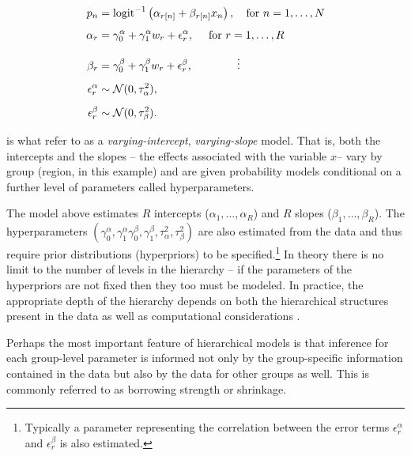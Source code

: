 %
\begin{align*}
p_n &= {\rm logit}^{-1}\left(\alpha_{r[n]} + \beta_{r[n]} x_n\right), \quad \text{for } n = 1, \dots, N \\[5pt]
 \alpha_r &= \gamma^\alpha_0 + \gamma^\alpha_1 w_r + \epsilon^\alpha_r, \quad \text{ for } r = 1, \dots, R \\[5pt]
  \beta_r &= \gamma^\beta_0 + \gamma^\beta_1 w_r + \epsilon^\beta_r, \qquad\qquad \vdots  \\[5pt]
   \epsilon^\alpha_r &\sim \mathcal{N}(0, \tau^2_\alpha), \\[5pt]
   \epsilon^\beta_r &\sim \mathcal{N}(0, \tau^2_\beta).
\end{align*}

\noindent is what  refer to as a {\it varying-intercept}, 
{\it varying-slope} model. That is, both the intercepts and the slopes -- the effects associated with the variable $x$-- vary by group (region, in this example) and are given probability models conditional on a further level of parameters called hyperparameters. 

The model above estimates $R$ intercepts ($\alpha_1, \dots, \alpha_R$) and $R$ slopes 
($\beta_1, \dots, \beta_R$). The hyperparameters
$(\gamma^\alpha_0, \gamma^\alpha_1 \gamma^\beta_0, \gamma^\beta_1, \tau^2_\alpha, \tau^2_\beta)$ 
are also estimated from the data and thus require prior distributions (hyperpriors) to be specified.\footnote{
Typically a parameter representing the correlation between the error terms 
$\epsilon_r^\alpha$ and $\epsilon_r^\beta$ is also estimated.} In theory there is no limit to the number 
of levels in the hierarchy -- if the parameters of the hyperpriors are not fixed then they too must 
be modeled. In practice, the appropriate depth of the hierarchy depends on both the hierarchical 
structures present in the data as well as computational considerations . 

Perhaps the most important feature of hierarchical models is that inference for each group-level 
parameter is informed not only by the group-specific information contained in the data but also 
by the data for other groups as well. This is commonly referred to as borrowing strength or shrinkage. 

